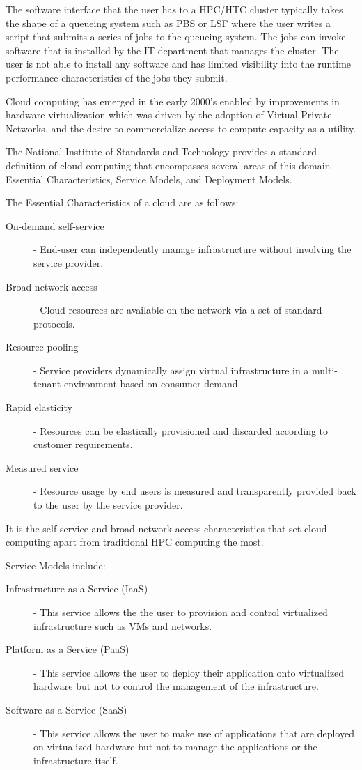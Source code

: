 The software interface that the user has to a HPC/HTC cluster typically takes the shape of a queueing system such as PBS\autocite{henderson1995job} or LSF\autocite{zhou1992lsf}  where the user writes a script that submits a series of jobs to the queueing system. The jobs can invoke software that is installed by the IT department that manages the cluster. The user is not able to install any software and has limited visibility into the runtime performance characteristics of the jobs they submit. 

Cloud computing has emerged in the early 2000's enabled by improvements in hardware virtualization which was driven by the adoption of Virtual Private Networks, and the desire to commercialize access to compute capacity as a utility\autocite{buyya2009cloud}.

The National Institute of Standards and Technology provides a standard definition of cloud computing that encompasses several areas of this domain - Essential Characteristics, Service Models, and Deployment Models\autocite{mell2011nist}.

The Essential Characteristics of a cloud are as follows:

\begin{description}
\item [On-demand self-service] - End-user can independently manage infrastructure without involving the service provider.
\item [Broad network access] - Cloud resources are available on the network via a set of standard protocols.
\item [Resource pooling] - Service providers dynamically assign virtual infrastructure in a multi-tenant environment based on consumer demand.
\item [Rapid elasticity] - Resources can be elastically provisioned and discarded according to customer requirements.
\item [Measured service] - Resource usage by end users is measured and transparently provided back to the user by the service provider.
\end{description}

It is the self-service and broad network access characteristics that set cloud computing apart from traditional HPC computing the most.

Service Models include:

\begin{description}
\item [Infrastructure as a Service (IaaS)] - This service allows the the user to provision and control virtualized infrastructure such as VMs and networks.
\item [Platform as a Service (PaaS)] - This service allows the user to deploy their application onto virtualized hardware but not to control the management of the infrastructure.
\item [Software as a Service (SaaS)] - This service allows the user to make use of applications that are deployed on virtualized hardware but not to manage the applications or the infrastructure itself.
\end{description}

